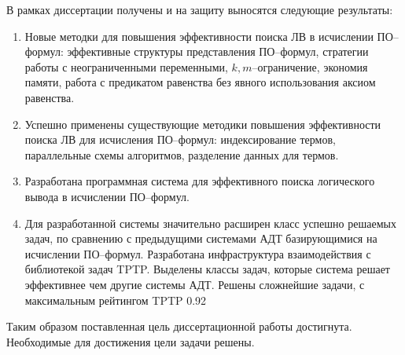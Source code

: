 В рамках диссертации получены и на защиту выносятся следующие результаты:
\begin{enumerate}
\item Новые методки для повышения эффективности поиска ЛВ в исчислении ПО--формул: эффективные структуры представления ПО--формул,  стратегии работы с неограниченными переменными, $k,m$--ограничение, экономия памяти, работа с предикатом равенства без явного использования аксиом равенства.

\item Успешно применены существующие методики повышения эффективности поиска ЛВ для исчисления ПО--формул: индексирование термов, параллельные схемы алгоритмов, разделение данных для термов.

\item Разработана программная система для эффективного поиска логического вывода в исчислении ПО--формул.

\item Для разработанной системы значительно расширен класс успешно решаемых задач, по сравнению с предыдущими системами АДТ базирующимися на исчислении ПО--формул. Разработана инфраструктура взаимодействия с библиотекой задач TPTP. Выделены классы задач, которые система решает эффективнее чем другие системы АДТ. Решены сложнейшие задачи, с максимальным рейтингом TPTP 0.92
\end{enumerate}

Таким образом поставленная цель диссертационной работы достигнута. Необходимые для достижения цели задачи решены.


